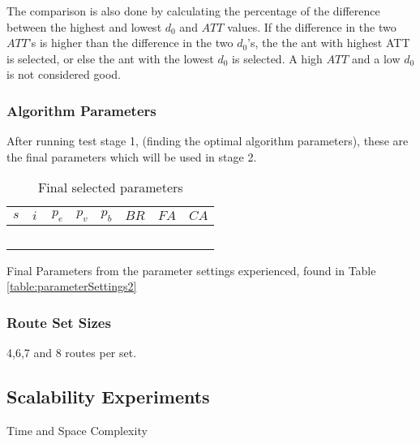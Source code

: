 The comparison is also done by calculating the percentage of the difference between the highest and lowest $d_0$ and $ATT$ values. If the difference in the two $ATT$'s is higher than the difference in the two $d_0$'s, the the ant with highest ATT is selected, or else the ant with the lowest $d_0$ is selected. A high $ATT$ and a low $d_0$ is not considered good. 

\subsubsection{Algorithm Parameters}
After running test stage 1, (finding the optimal algorithm parameters), these are the final parameters which will be used in stage 2.

\begin{table}[H]
	\centering
    \begin{tabular}{|l|l|l|l|l|l|l|l|}
 	\hline
 	$s$ & $i$ & $p_{e}$ & $p_{v}$ & $p_{b}$ & $BR$ & $FA$ & $CA$  \\
 	\hline
    ~ & ~ & ~ & ~ & ~ & ~ & ~ & ~ \\
	\hline
    \end{tabular}
    \caption {Final selected parameters}
    Final Parameters from the parameter settings experienced, found in Table \vref{table:parameterSettings2}
    \label{table:finalParameters}
	\end{table}

\subsubsection{Route Set Sizes}
4,6,7 and 8 routes per set.

\subsection{Scalability Experiments}
Time and Space Complexity
